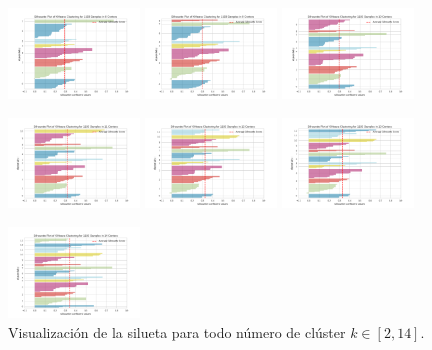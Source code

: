 \documentclass[10pt, a4paper]{article}
\begin{document}
\begin{figure}[H]
			\includegraphics[width = 3.5cm]{silhouette_visualization_8_bf.png}
			\includegraphics[width = 3.5cm]{silhouette_visualization_9_bf.png}
			\includegraphics[width = 3.5cm]{silhouette_visualization_10_bf.png}
		
			\includegraphics[width = 3.5cm]{silhouette_visualization_11_bf.png}
			\includegraphics[width = 3.5cm]{silhouette_visualization_12_bf.png}
			\includegraphics[width = 3.5cm]{silhouette_visualization_13_bf.png}
			
			\includegraphics[width = 3.5cm]{silhouette_visualization_14_bf.png}
			
			\caption{Visualizaci\'on de la silueta para todo n\'umero de cl\'uster $k\in[2, 14]$.}
		\end{figure}
		
\end{document}
